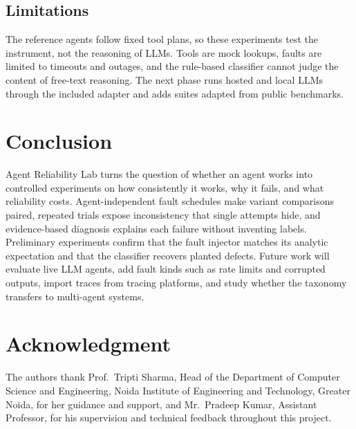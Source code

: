 \documentclass[conference,a4paper]{IEEEtran}
\begin{document}
\subsection{Limitations}
The reference agents follow fixed tool plans, so these experiments test the instrument,
not the reasoning of LLMs. Tools are mock lookups, faults are limited to timeouts and
outages, and the rule-based classifier cannot judge the content of free-text reasoning.
The next phase runs hosted and local LLMs through the included adapter and adds suites
adapted from public benchmarks.

\section{Conclusion}

Agent Reliability Lab turns the question of whether an agent works into controlled
experiments on how consistently it works, why it fails, and what reliability costs.
Agent-independent fault schedules make variant comparisons paired, repeated trials
expose inconsistency that single attempts hide, and evidence-based diagnosis explains
each failure without inventing labels. Preliminary experiments confirm that the fault
injector matches its analytic expectation and that the classifier recovers planted
defects. Future work will evaluate live LLM agents, add fault kinds such as rate limits
and corrupted outputs, import traces from tracing platforms, and study whether the
taxonomy transfers to multi-agent systems.

\section*{Acknowledgment}

The authors thank Prof.\ Tripti Sharma, Head of the Department of Computer Science and
Engineering, Noida Institute of Engineering and Technology, Greater Noida, for her
guidance and support, and Mr.\ Pradeep Kumar, Assistant Professor, for his supervision
and technical feedback throughout this project.
\end{document}
